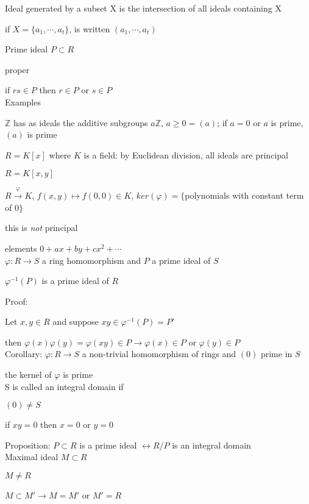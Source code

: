 \documentclass[12pt]{article}
\begin{document}
\noindent
Ideal generated by a subset X is the intersection of all ideals containing X

if $X = \{a_1, \cdots, a_t\}$, is written $(a_1, \cdots, a_t)$

\noindent
Prime ideal $P \subset R$

proper

if $rs \in P$ then $r \in P$ or $s \in P$\\

\noindent
Examples

\noindent
$\mathds{Z}$ has as ideals the additive subgroups $a\mathds{Z}$, $a \geq 0 = (a)$; if $a=0$ or $a$ is prime, $(a)$ is prime

\noindent
$R = K[x]$ where $K$ is a field: by Euclidean division, all ideals are principal

\noindent
$R = K[x, y]$

$R \xrightarrow{\varphi} K$, $f(x, y) \mapsto f(0, 0) \in K$, $ker(\varphi) = \{$polynomials with constant term of 0$\}$

this is \textit{not} principal

elements $0 + ax + by + cx^2 + \cdots$\\

\noindent
$\varphi: R \to S$ a ring homomorphism and $P$ a prime ideal of $S$

$\varphi^{-1}(P)$ is a prime ideal of $R$

\noindent
Proof:

Let $x, y \in R$ and suppose $xy \in \varphi^{-1}(P) = P'$

then $\varphi(x)\varphi(y) = \varphi(xy) \in P \to \varphi(x) \in P$ or $\varphi(y) \in P$\\

\noindent
Corollary: $\varphi: R \to S$ a non-trivial homomorphism of rings and $(0)$ prime in $S$

the kernel of $\varphi$ is prime\\

\noindent
S is called an integral domain if 

$(0) \neq S$

if $xy = 0$ then $x = 0$ or $y = 0$

\noindent
Proposition: $P \subset R$ is a prime ideal $\leftrightarrow R/P$ is an integral domain\\

\noindent
Maximal ideal $M \subset R$

$M \neq R$

$M \subset M' \to M = M'$ or $M' = R$
\end{document}
